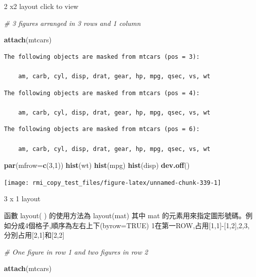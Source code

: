 \documentclass[]{book}
\newenvironment{Shaded}{\begin{snugshade}}{\end{snugshade}}
\newcommand{\CommentTok}[1]{\textcolor[rgb]{0.56,0.35,0.01}{\textit{#1}}}
\newcommand{\DataTypeTok}[1]{\textcolor[rgb]{0.13,0.29,0.53}{#1}}
\newcommand{\DecValTok}[1]{\textcolor[rgb]{0.00,0.00,0.81}{#1}}
\newcommand{\KeywordTok}[1]{\textcolor[rgb]{0.13,0.29,0.53}{\textbf{#1}}}
\newcommand{\NormalTok}[1]{#1}
\theoremstyle{definition}
\theoremstyle{definition}
\theoremstyle{definition}
\theoremstyle{remark}
\begin{document}
2 x2 layout click to view

\begin{Shaded}
\begin{Highlighting}[]
\CommentTok{# 3 figures arranged in 3 rows and 1 column}

\KeywordTok{attach}\NormalTok{(mtcars)}
\end{Highlighting}
\end{Shaded}

\begin{verbatim}
The following objects are masked from mtcars (pos = 3):

    am, carb, cyl, disp, drat, gear, hp, mpg, qsec, vs, wt
\end{verbatim}

\begin{verbatim}
The following objects are masked from mtcars (pos = 4):

    am, carb, cyl, disp, drat, gear, hp, mpg, qsec, vs, wt
\end{verbatim}

\begin{verbatim}
The following objects are masked from mtcars (pos = 6):

    am, carb, cyl, disp, drat, gear, hp, mpg, qsec, vs, wt
\end{verbatim}

\begin{Shaded}
\begin{Highlighting}[]
\KeywordTok{par}\NormalTok{(}\DataTypeTok{mfrow=}\KeywordTok{c}\NormalTok{(}\DecValTok{3}\NormalTok{,}\DecValTok{1}\NormalTok{)) }
\KeywordTok{hist}\NormalTok{(wt)}
\KeywordTok{hist}\NormalTok{(mpg)}
\KeywordTok{hist}\NormalTok{(disp)}
\KeywordTok{dev.off}\NormalTok{()}
\end{Highlighting}
\end{Shaded}

\begin{center}\texttt{[image: rmi\_copy\_test\_files/figure-latex/unnamed-chunk-339-1]} \end{center}

3 x 1 layout

函數 layout( ) 的使用方法為 layout(mat) 其中 mat
的元素用來指定圖形號碼。例如分成4個格子,順序為左右上下(byrow=TRUE)
1在第一ROW,占用{[}1,1{]}-{[}1,2{]},2,3,分別占用{[}2,1{]}和{[}2,2{]}

\begin{Shaded}
\begin{Highlighting}[]
\CommentTok{# One figure in row 1 and two figures in row 2}
 
\KeywordTok{attach}\NormalTok{(mtcars)}
\end{Highlighting}
\end{Shaded}
\end{document}

